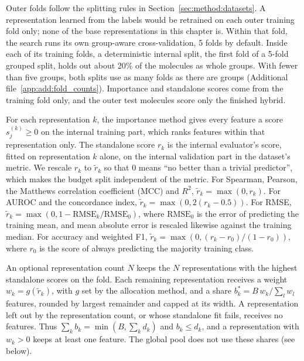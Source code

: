 Outer folds follow the splitting rules in Section~\ref{sec:method:datasets}. A representation learned from the labels would be retrained on each outer training fold only; none of the base representations in this chapter is. Within that fold, the search runs its own group-aware cross-validation, 5 folds by default. Inside each of its training folds, a deterministic internal split, the first fold of a 5-fold grouped split, holds out about 20\% of the molecules as whole groups. With fewer than five groups, both splits use as many folds as there are groups (Additional file~\ref{app:add:fold_counts}). Importance and standalone scores come from the training fold only, and the outer test molecules score only the finished hybrid.

For each representation $k$, the importance method gives every feature a score $s^{(k)}_j \ge 0$ on the internal training part, which ranks features within that representation only. The standalone score $r_k$ is the internal evaluator's score, fitted on representation $k$ alone, on the internal validation part in the dataset's metric. We rescale $r_k$ to $\tilde r_k$ so that 0 means ``no better than a trivial predictor'', which makes the budget split independent of the metric. For Spearman, Pearson, the Matthews correlation coefficient (MCC) and $R^2$, $\tilde r_k = \max(0, r_k)$. For AUROC and the concordance index, $\tilde r_k = \max(0, 2(r_k - 0.5))$. For RMSE, $\tilde r_k = \max(0, 1 - \mathrm{RMSE}_k/\mathrm{RMSE}_0)$, where $\mathrm{RMSE}_0$ is the error of predicting the training mean, and mean absolute error is rescaled likewise against the training median. For accuracy and weighted F1, $\tilde r_k = \max(0, (r_k - r_0)/(1 - r_0))$, where $r_0$ is the score of always predicting the majority training class.

An optional representation count $N$ keeps the $N$ representations with the highest standalone scores on the fold. Each remaining representation receives a weight $w_k = g(\tilde r_k)$, with $g$ set by the allocation method, and a share $b^*_k = B\, w_k / \sum_l w_l$ features, rounded by largest remainder and capped at its width. A representation left out by the representation count, or whose standalone fit fails, receives no features. Thus $\sum_k b_k = \min(B, \sum_k d_k)$ and $b_k \le d_k$, and a representation with $w_k > 0$ keeps at least one feature. The global pool does not use these shares (see below).

